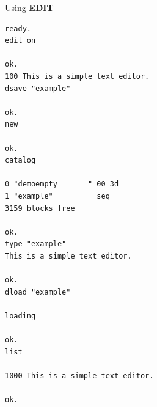 \begin{description}[leftmargin=2cm,style=nextline]
\newpage

\item [Example:] Using {\bf EDIT}
\begin{tcolorbox}[colback=black,coltext=white]
\verbatimfont{\codefont}
\begin{verbatim}
ready.
edit on

ok.
100 This is a simple text editor.
dsave "example"

ok.
new

ok.
catalog

0 "demoempty       " 00 3d
1 "example"          seq
3159 blocks free

ok.
type "example"
This is a simple text editor.

ok.
dload "example"

loading

ok.
list

1000 This is a simple text editor.

ok.
\end{verbatim}
\end{tcolorbox}
\end{description}


\newpage
